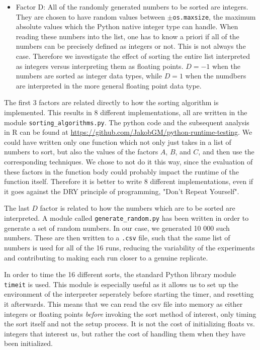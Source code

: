 \begin{itemize}
    \item Factor D: All of the randomly generated numbers to be sorted are integers. They are chosen to have random values between $\pm$\texttt{os.maxsize}, the maximum absolute values which the Python native integer type can handle. When reading these numbers into the list, one has to know a priori if all of the numbers can be precisely defined as integers or not. This is not always the case. Therefore we investigate the effect of sorting the entire list interpreted as integers versus interpreting them as floating points. $D=-1$ when the numbers are sorted as integer data types, while $D=1$ when the numdbers are interpreted in the more general floating point data type.
\end{itemize}

The first 3 factors are related directly to how the sorting algorithm is implemented. This results in 8 different implementations, all are written in the module \texttt{sorting{\_}algorithms.py}. The python code and the subsequent analysis in R can be found at \url{https://github.com/JakobGM/python-runtime-testing}. We could have written only one function which not only just takes in a list of numbers to sort, but also the values of the factors $A$, $B$, and $C$, and then use the corresponding techniques. We chose to not do it this way, since the evaluation of these factors in the function body could probably impact the runtime of the function itself. Therefore it is better to write 8 different implementations, even if it goes against the DRY principle of programming, "Don't Repeat Yourself".

The last $D$ factor is related to how the numbers which are to be sorted are interpreted. A module called \texttt{generate{\_}random.py} has been written in order to generate a set of random numbers. In our case, we generated 10 000 such numbers. These are then written to a \texttt{.csv} file, such that the same list of numbers is used for all of the 16 runs, reducing the variability of the experiments and contributing to making each run closer to a genuine replicate.

In order to time the 16 different sorts, the standard Python library module \texttt{timeit} is used. This module is especially useful as it allows us to set up the environment of the interpreter seperately before starting the timer, and resetting it afterwards. This means that we can read the csv file into memory as either integers or floating points \textit{before} invoking the sort method of interest, only timing the sort itself and not the setup process. It is not the cost of initializing floats vs. integers that interest us, but rather the cost of handling them when they have been initialized.

